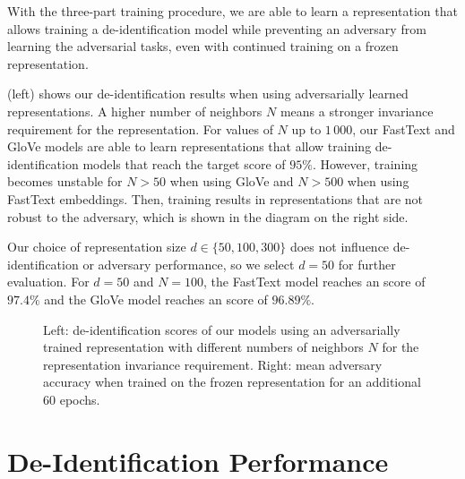 %
With the three-part training procedure, we are able to learn a representation that allows training a de-identification model while preventing an adversary from learning the adversarial tasks, even with continued training on a frozen representation.

%
 (left) shows our de-identification results when using adversarially learned representations.
%
A higher number of neighbors $N$ means a stronger invariance requirement for the representation.
%
For values of $N$ up to $1\,000$, our FastText and GloVe models are able to learn representations that allow training de-identification models that reach the target \fone score of $95\%$.
%
However, training becomes unstable for $N>50$ when using GloVe and $N>500$ when using FastText embeddings.
%
Then, training results in representations that are not robust to the adversary, which is shown in the diagram on the right side.

%
Our choice of representation size $d \in \{50, 100, 300\}$ does not influence de-identifi\-ca\-tion or adversary performance, so we select $d=50$ for further evaluation.
%
For $d=50$ and $N=100$, the FastText model reaches an \fone score of $97.4\%$ and the GloVe model reaches an \fone score of $96.89\%$.

\begin{figure*}
    \centering
    
    \caption[De-identification with adversarially learned representations]{%
        Left: de-identification \fone scores of our models using an adversarially trained representation with different numbers of neighbors $N$ for the representation invariance requirement.
        Right: mean adversary accuracy when trained on the frozen representation for an additional 60 epochs.
    }\label{fig:adversarial-deid}
\end{figure*}

\section{De-Identification Performance}

